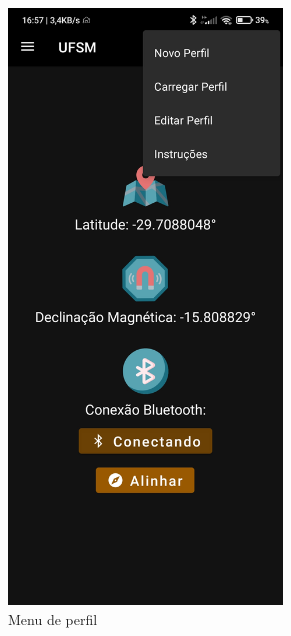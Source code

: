 \begin{figure}[!htb]
\begin{subfigure}[b]{0.3\textwidth}
		\includegraphics[width=0.8\textwidth]{figuras/desAplicativo/overflow}
		\caption{Menu de perfil}
		\label{menuperfilv}
	\end{subfigure}
	\hfill
	\begin{subfigure}[b]{0.3\textwidth}
		\centering

\end{subfigure}
\end{figure}
